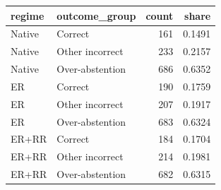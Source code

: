 \begin{tabular}{llrr}
\toprule
regime & outcome_group & count & share \\
\midrule
Native & Correct & 161 & 0.1491 \\
Native & Other incorrect & 233 & 0.2157 \\
Native & Over-abstention & 686 & 0.6352 \\
ER & Correct & 190 & 0.1759 \\
ER & Other incorrect & 207 & 0.1917 \\
ER & Over-abstention & 683 & 0.6324 \\
ER+RR & Correct & 184 & 0.1704 \\
ER+RR & Other incorrect & 214 & 0.1981 \\
ER+RR & Over-abstention & 682 & 0.6315 \\
\bottomrule
\end{tabular}
